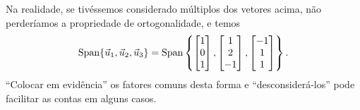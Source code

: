 \documentclass[../livro.tex]{subfiles}  %
\begin{document}
\begin{example}
Na realidade, se tivéssemos considerado múltiplos dos vetores acima, não perderíamos a propriedade de ortogonalidade, e temos
\begin{equation}
\operatorname{Span} \{ \vec{u}_1, \vec{u}_2, \vec{u}_3 \} =
\operatorname{Span} \left\{
\begin{bmatrix}
1 \\ 0 \\ 1
\end{bmatrix},
\begin{bmatrix}
1 \\ 2 \\ -1
\end{bmatrix},
\begin{bmatrix}
-1 \\ 1 \\ 1
\end{bmatrix}
\right\}.
\end{equation} ``Colocar em evidência'' os fatores comuns desta forma e ``desconsiderá-los'' pode facilitar as contas em alguns casos.


\end{example}
\end{document}
